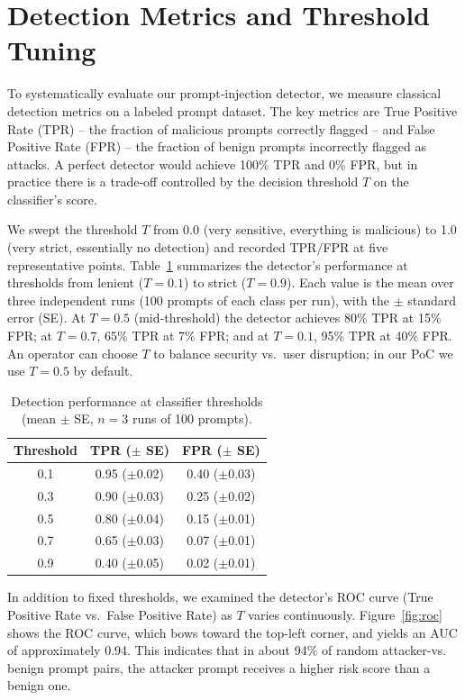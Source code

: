 \documentclass[conference]{IEEEtran}
\begin{document}
\section{Detection Metrics and Threshold Tuning}
\label{sec:metrics_endpoint}

To systematically evaluate our prompt‐injection detector, we measure classical detection metrics on a labeled prompt dataset. The key metrics are True Positive Rate (TPR) – the fraction of malicious prompts correctly flagged – and False Positive Rate (FPR) – the fraction of benign prompts incorrectly flagged as attacks. A perfect detector would achieve 100\% TPR and 0\% FPR, but in practice there is a trade‐off controlled by the decision threshold $T$ on the classifier’s score.

We swept the threshold $T$ from 0.0 (very sensitive, everything is malicious) to 1.0 (very strict, essentially no detection) and recorded TPR/FPR at five representative points. Table~\ref{tab:thresholds} summarizes the detector’s performance at thresholds from lenient ($T=0.1$) to strict ($T=0.9$). Each value is the mean over three independent runs (100 prompts of each class per run), with the $\pm$ standard error (SE). At $T=0.5$ (mid‐threshold) the detector achieves 80\% TPR at 15\% FPR; at $T=0.7$, 65\% TPR at 7\% FPR; and at $T=0.1$, 95\% TPR at 40\% FPR. An operator can choose $T$ to balance security vs.\ user disruption; in our PoC we use $T=0.5$ by default.

\begin{table}[ht]
  \centering
  \caption{Detection performance at classifier thresholds (mean $\pm$ SE, $n=3$ runs of 100 prompts).}
  \label{tab:thresholds}
  \begin{tabular}{c c c}
    \toprule
    \textbf{Threshold} & \textbf{TPR ($\pm$ SE)} & \textbf{FPR ($\pm$ SE)} \\
    \midrule
    0.1 & 0.95 ($\pm$0.02) & 0.40 ($\pm$0.03) \\
    0.3 & 0.90 ($\pm$0.03) & 0.25 ($\pm$0.02) \\
    0.5 & 0.80 ($\pm$0.04) & 0.15 ($\pm$0.01) \\
    0.7 & 0.65 ($\pm$0.03) & 0.07 ($\pm$0.01) \\
    0.9 & 0.40 ($\pm$0.05) & 0.02 ($\pm$0.01) \\
    \bottomrule
  \end{tabular}
\end{table}

In addition to fixed thresholds, we examined the detector’s ROC curve (True Positive Rate vs.\ False Positive Rate) as $T$ varies continuously. Figure~\ref{fig:roc} shows the ROC curve, which bows toward the top-left corner, and yields an AUC of approximately 0.94. This indicates that in about 94\% of random attacker-vs. benign prompt pairs, the attacker prompt receives a higher risk score than a benign one.
\end{document}
